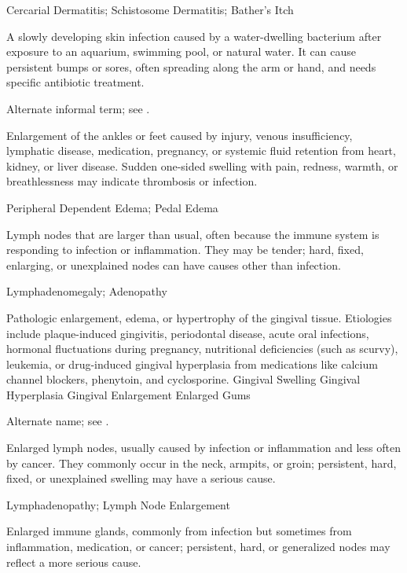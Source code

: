\synonyms
Cercarial Dermatitis; Schistosome Dermatitis; Bather's Itch

 A slowly developing skin infection caused by a water-dwelling bacterium after exposure to an aquarium, swimming pool, or natural water. It can cause persistent bumps or sores, often spreading along the arm or hand, and needs specific antibiotic treatment.

 Alternate informal term; see .

 Enlargement of the ankles or feet caused by injury, venous insufficiency, lymphatic disease, medication,
pregnancy, or systemic fluid retention from heart, kidney, or liver disease. Sudden one-sided swelling with pain,
redness, warmth, or breathlessness may indicate thrombosis or infection.

\synonyms
Peripheral Dependent Edema; Pedal Edema

 Lymph nodes that are larger than usual, often because the immune system is responding to infection or inflammation. They may be tender; hard, fixed, enlarging, or unexplained nodes can have causes other than infection.

\synonyms
Lymphadenomegaly; Adenopathy

 Pathologic enlargement, edema, or hypertrophy of the gingival tissue. Etiologies include plaque-induced gingivitis, periodontal disease, acute oral infections, hormonal fluctuations during pregnancy, nutritional deficiencies (such as scurvy), leukemia, or drug-induced gingival hyperplasia from medications like calcium channel blockers, phenytoin, and cyclosporine.
\synonyms
Gingival Swelling
Gingival Hyperplasia
Gingival Enlargement
Enlarged Gums

 Alternate name; see .

 Enlarged lymph nodes, usually caused by infection or inflammation and less often by cancer. They commonly occur in the neck, armpits, or groin; persistent, hard, fixed, or unexplained swelling may have a serious cause.

\synonyms
Lymphadenopathy; Lymph Node Enlargement

 Enlarged immune glands, commonly from infection but sometimes from inflammation, medication, or cancer; persistent, hard, or generalized nodes may reflect a more serious cause.

